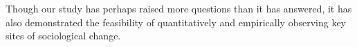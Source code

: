 Though our study has perhaps raised more questions than it has answered, it has also demonstrated the feasibility of quantitatively and empirically observing key sites of sociological change.



    
